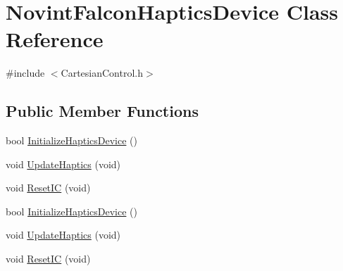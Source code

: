 \hypertarget{classNovintFalconHapticsDevice}{}\section{Novint\+Falcon\+Haptics\+Device Class Reference}
\label{classNovintFalconHapticsDevice}


{\ttfamily \#include $<$Cartesian\+Control.\+h$>$}

\subsection*{Public Member Functions}
\begin{DoxyCompactItemize}
\item 
bool \hyperlink{classNovintFalconHapticsDevice_ac4fe257d1b4ebb3bca073bae6f8a3542}{Initialize\+Haptics\+Device} ()
\item 
void \hyperlink{classNovintFalconHapticsDevice_a6f3fa36cd75a7a4c53950f5552f82ad2}{Update\+Haptics} (void)
\item 
void \hyperlink{classNovintFalconHapticsDevice_a49d2c9beea12a5b1c5b42e9f77d453ad}{Reset\+IC} (void)
\item 
bool \hyperlink{classNovintFalconHapticsDevice_ac4fe257d1b4ebb3bca073bae6f8a3542}{Initialize\+Haptics\+Device} ()
\item 
void \hyperlink{classNovintFalconHapticsDevice_a6f3fa36cd75a7a4c53950f5552f82ad2}{Update\+Haptics} (void)
\item 
void \hyperlink{classNovintFalconHapticsDevice_a49d2c9beea12a5b1c5b42e9f77d453ad}{Reset\+IC} (void)
\end{DoxyCompactItemize}
